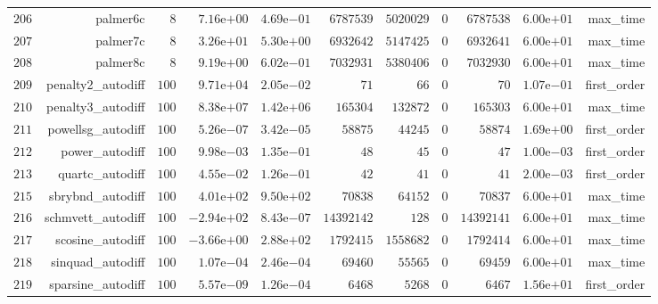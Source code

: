 \documentclass[varwidth=20cm,crop=true]{standalone}
\begin{document}
\begin{longtable}{rrrrrrrrrrr}
  \(   206\) & palmer6c & \(     8\) & \( 7.16\)e\(+00\) & \( 4.69\)e\(-01\) & \(6787539\) & \(5020029\) & \(     0\) & \(6787538\) & \( 6.00\)e\(+01\) & max\_time \\
  \(   207\) & palmer7c & \(     8\) & \( 3.26\)e\(+01\) & \( 5.30\)e\(+00\) & \(6932642\) & \(5147425\) & \(     0\) & \(6932641\) & \( 6.00\)e\(+01\) & max\_time \\
  \(   208\) & palmer8c & \(     8\) & \( 9.19\)e\(+00\) & \( 6.02\)e\(-01\) & \(7032931\) & \(5380406\) & \(     0\) & \(7032930\) & \( 6.00\)e\(+01\) & max\_time \\
  \(   209\) & penalty2\_autodiff & \(   100\) & \( 9.71\)e\(+04\) & \( 2.05\)e\(-02\) & \(    71\) & \(    66\) & \(     0\) & \(    70\) & \( 1.07\)e\(-01\) & first\_order \\
  \(   210\) & penalty3\_autodiff & \(   100\) & \( 8.38\)e\(+07\) & \( 1.42\)e\(+06\) & \(165304\) & \(132872\) & \(     0\) & \(165303\) & \( 6.00\)e\(+01\) & max\_time \\
  \(   211\) & powellsg\_autodiff & \(   100\) & \( 5.26\)e\(-07\) & \( 3.42\)e\(-05\) & \( 58875\) & \( 44245\) & \(     0\) & \( 58874\) & \( 1.69\)e\(+00\) & first\_order \\
  \(   212\) & power\_autodiff & \(   100\) & \( 9.98\)e\(-03\) & \( 1.35\)e\(-01\) & \(    48\) & \(    45\) & \(     0\) & \(    47\) & \( 1.00\)e\(-03\) & first\_order \\
  \(   213\) & quartc\_autodiff & \(   100\) & \( 4.55\)e\(-02\) & \( 1.26\)e\(-01\) & \(    42\) & \(    41\) & \(     0\) & \(    41\) & \( 2.00\)e\(-03\) & first\_order \\
  \(   215\) & sbrybnd\_autodiff & \(   100\) & \( 4.01\)e\(+02\) & \( 9.50\)e\(+02\) & \( 70838\) & \( 64152\) & \(     0\) & \( 70837\) & \( 6.00\)e\(+01\) & max\_time \\
  \(   216\) & schmvett\_autodiff & \(   100\) & \(-2.94\)e\(+02\) & \( 8.43\)e\(-07\) & \(14392142\) & \(   128\) & \(     0\) & \(14392141\) & \( 6.00\)e\(+01\) & max\_time \\
  \(   217\) & scosine\_autodiff & \(   100\) & \(-3.66\)e\(+00\) & \( 2.88\)e\(+02\) & \(1792415\) & \(1558682\) & \(     0\) & \(1792414\) & \( 6.00\)e\(+01\) & max\_time \\
  \(   218\) & sinquad\_autodiff & \(   100\) & \( 1.07\)e\(-04\) & \( 2.46\)e\(-04\) & \( 69460\) & \( 55565\) & \(     0\) & \( 69459\) & \( 6.00\)e\(+01\) & max\_time \\
  \(   219\) & sparsine\_autodiff & \(   100\) & \( 5.57\)e\(-09\) & \( 1.26\)e\(-04\) & \(  6468\) & \(  5268\) & \(     0\) & \(  6467\) & \( 1.56\)e\(+01\) & first\_order \\

\end{longtable}
\end{document}
